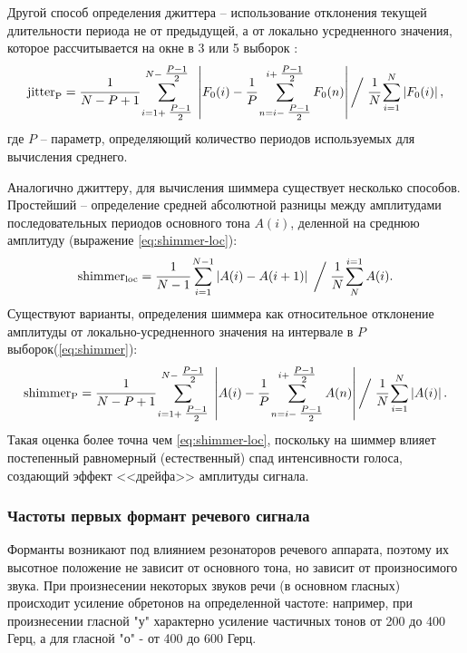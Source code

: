 Другой способ определения джиттера -- использование отклонения текущей длительности периода не от предыдущей, а от локально усредненного значения, которое рассчитывается на окне в 3 или 5 выборок \cite{farrus2007jitter}:
\begin{equation}\label{eq:jitter}
	\mathrm{jitter}_{\mathrm{P}} = \cfrac{1}{N - P + 1}\sum_{i = 1 + \textstyle\frac{P - 1}{2}}^{N - \textstyle\frac{P - 1}{2}}\;\left|F_0(i) - \cfrac{1}{P}\sum^{i + \textstyle\frac{P - 1}{2}}_{n = i - \textstyle\frac{P - 1}{2}}F_0(n)\right|\bigg/\;\cfrac{1}{N}\sum_{i = 1}^{N}\left|F_0(i)\right|,
\end{equation}
где $P$ -- параметр, определяющий количество периодов используемых для вычисления среднего.


Аналогично джиттеру, для вычисления шиммера существует несколько способов. Простейший -- определение средней абсолютной разницы между амплитудами последовательных периодов основного тона $A(i)$, деленной на среднюю амплитуду (выражение \ref{eq:shimmer-loc}):
\begin{equation}\label{eq:shimmer-loc}
	\mathrm{shimmer}_{\mathrm{loc}} = \cfrac{1}{N - 1}\sum_{i = 1}^{N - 1}\left|A(i) - A(i + 1)\right|\;\bigg/\;
	\cfrac{1}{N}\sum_{N}^{i = 1}A(i).
\end{equation}
Существуют варианты, определения шиммера как относительное отклонение амплитуды от локально-усредненного значения на интервале в $P$ выборок(\ref{eq:shimmer}):
\begin{equation}\label{eq:shimmer}
	\mathrm{shimmer}_{\mathrm{P}} = \cfrac{1}{N - P + 1}\sum_{i = 1 + \textstyle\frac{P - 1}{2}}^{N - \textstyle\frac{P - 1}{2}}\;\left|A(i) - \cfrac{1}{P}\sum^{i + \textstyle\frac{P - 1}{2}}_{n = i - \textstyle\frac{P - 1}{2}}A(n)\right|\bigg/\;\cfrac{1}{N}\sum_{i = 1}^{N}\left|A(i)\right|.
\end{equation}
Такая оценка более точна чем \ref{eq:shimmer-loc}, поскольку на шиммер влияет постепенный равномерный (естественный) спад интенсивности голоса, создающий эффект <<дрейфа>> амплитуды сигнала.~\cite{baken2000clinical} 
\subsubsection{Частоты первых формант речевого сигнала}
Форманты возникают под влиянием резонаторов речевого аппарата, поэтому их высотное положение не зависит от основного тона, но зависит от произносимого звука. При произнесении некоторых звуков речи (в основном гласных) происходит усиление обретонов на определенной частоте: например, при произнесении гласной "у" характерно усиление частичных тонов от 200 до 400 Герц, а для гласной "о" - от 400 до 600 Герц.

